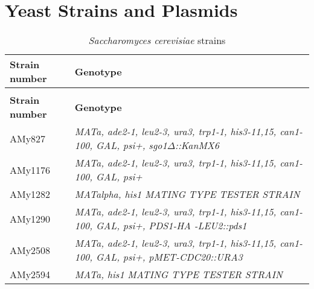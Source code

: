 \chapter{Yeast Strains and Plasmids}
\label{append:strainsplasmids}

\begin{longtable}{p{}p{}}
\caption{\textit{Saccharomyces cerevisiae} strains}
\label{tab:cerevisiaetable}\\
\hline
\textbf{Strain number} & \textbf{Genotype}
\\
\hline                 
\endfirsthead
\\
\hline
\textbf{Strain number} & \textbf{Genotype}
\\
\hline 
\endhead
\hline
\endfoot
AMy827          & \textit{MATa, ade2-1, leu2-3, ura3,   trp1-1, his3-11,15, can1-100, GAL, psi+, sgo1$\Delta$::KanMX6}                                                                                                                                                          \\
AMy1176         & \textit{MATa, ade2-1, leu2-3, ura3,   trp1-1, his3-11,15, can1-100, GAL, psi+}                                                                                                                                                                         \\
AMy1282         & \textit{MATalpha, his1 MATING TYPE   TESTER STRAIN}                                                                                                                                                                                                    \\
AMy1290         & \textit{MATa, ade2-1, leu2-3, ura3,   trp1-1, his3-11,15, can1-100, GAL, psi+, PDS1-HA -LEU2::pds1}                                                                                                                                                    \\
AMy2508         & \textit{MATa, ade2-1, leu2-3, ura3,   trp1-1, his3-11,15, can1-100, GAL, psi+, pMET-CDC20::URA3}                                                                                                                                                       \\
AMy2594         & \textit{MATa, his1 MATING TYPE TESTER   STRAIN}                                                                                                                                                                                                        \\

\end{longtable}
